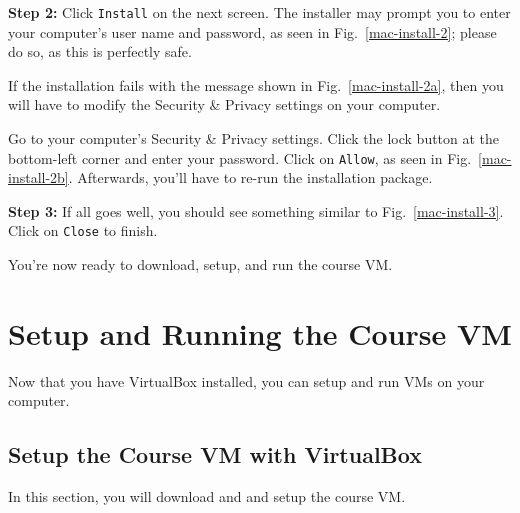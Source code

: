\documentclass[11pt]{article}
\begin{document}
\textbf{Step 2:} Click \texttt{Install} on the next screen. The installer may prompt you to enter your computer's user name and password, as seen in Fig.~\ref{mac-install-2}; please do so, as this is perfectly safe.

If the installation fails with the message shown in Fig.~\ref{mac-install-2a}, then you will have to modify the Security \& Privacy settings on your computer.

Go to your computer's Security \& Privacy settings. Click the lock button at the bottom-left corner and enter your password. Click on \texttt{Allow}, as seen in Fig.~\ref{mac-install-2b}. Afterwards, you'll have to re-run the installation package.

\textbf{Step 3:} If all goes well, you should see something similar to Fig.~\ref{mac-install-3}. Click on \texttt{Close} to finish.

You're now ready to download, setup, and run the course VM.


\section{Setup and Running the Course VM}
\label{sec:setup-run-vm}
Now that you have VirtualBox installed, you can setup and run VMs on your computer. 

\subsection{Setup the Course VM with VirtualBox}
\label{subsec:setup-vm}
In this section, you will download and and setup the course VM.
\end{document}
